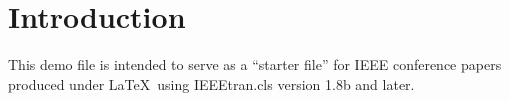 \section{Introduction}
\label{Introduction}

This demo file is intended to serve as a ``starter file''
for IEEE conference papers produced under \LaTeX\ using
IEEEtran.cls version 1.8b and later.